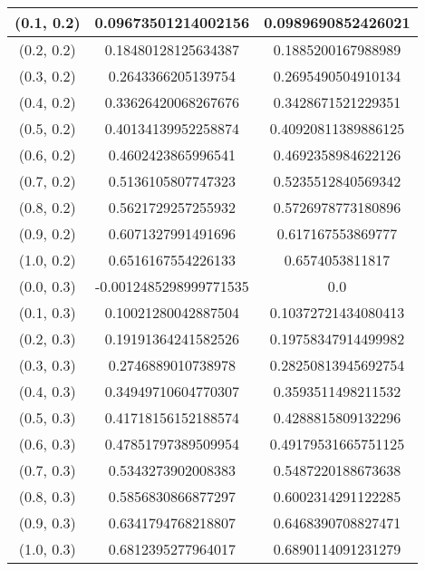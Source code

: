 \begin{table}[H]
\begin{tabular}{|c|c|c|}
\hline
(0.1, 0.2) & 0.09673501214002156 & 0.0989690852426021 \\
\hline
(0.2, 0.2) & 0.18480128125634387 & 0.1885200167988989 \\
\hline
(0.3, 0.2) & 0.2643366205139754 & 0.2695490504910134 \\
\hline
(0.4, 0.2) & 0.33626420068267676 & 0.3428671521229351 \\
\hline
(0.5, 0.2) & 0.40134139952258874 & 0.40920811389886125 \\
\hline
(0.6, 0.2) & 0.4602423865996541 & 0.4692358984622126 \\
\hline
(0.7, 0.2) & 0.5136105807747323 & 0.5235512840569342 \\
\hline
(0.8, 0.2) & 0.5621729257255932 & 0.5726978773180896 \\
\hline
(0.9, 0.2) & 0.6071327991491696 & 0.617167553869777 \\
\hline
(1.0, 0.2) & 0.6516167554226133 & 0.6574053811817 \\
\hline
\hline
(0.0, 0.3) & -0.0012485298999771535 & 0.0 \\
\hline
(0.1, 0.3) & 0.10021280042887504 & 0.10372721434080413 \\
\hline
(0.2, 0.3) & 0.19191364241582526 & 0.19758347914499982 \\
\hline
(0.3, 0.3) & 0.2746889010738978 & 0.28250813945692754 \\
\hline
(0.4, 0.3) & 0.34949710604770307 & 0.3593511498211532 \\
\hline
(0.5, 0.3) & 0.41718156152188574 & 0.4288815809132296 \\
\hline
(0.6, 0.3) & 0.47851797389509954 & 0.49179531665751125 \\
\hline
(0.7, 0.3) & 0.5343273902008383 & 0.5487220188673638 \\
\hline
(0.8, 0.3) & 0.5856830866877297 & 0.6002314291122285 \\
\hline
(0.9, 0.3) & 0.6341794768218807 & 0.6468390708827471 \\
\hline
(1.0, 0.3) & 0.6812395277964017 & 0.6890114091231279 \\
\hline
\end{tabular}
\end{table}
